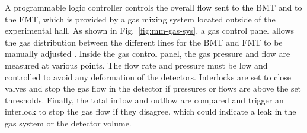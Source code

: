 A programmable logic controller controls the overall flow sent to the BMT and to the FMT, which is provided by a gas mixing
system located outside of the experimental hall. As shown in Fig.~\ref{fig:mm-gas-sys}, a gas control panel allows the gas
distribution between the different lines for the BMT and FMT to be manually adjusted . Inside the gas control panel, the gas
pressure and flow are measured at various points. The flow rate and pressure must be low and controlled to avoid any
deformation of the detectors. Interlocks are set to close valves and stop the gas flow in the detector if pressures or flows are
above the set thresholds. Finally, the total inflow and outflow are compared and trigger an interlock to stop the gas flow if they
disagree, which could indicate a leak in the gas system or the detector volume. 
